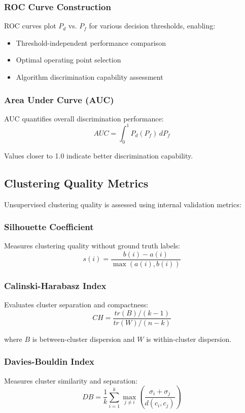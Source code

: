 \subsubsection{ROC Curve Construction}
ROC curves plot $P_d$ vs. $P_f$ for various decision thresholds, enabling:
\begin{itemize}
\item Threshold-independent performance comparison
\item Optimal operating point selection
\item Algorithm discrimination capability assessment
\end{itemize}

\subsubsection{Area Under Curve (AUC)}
AUC quantifies overall discrimination performance:
\begin{equation}
AUC = \int_0^1 P_d(P_f) \, dP_f
\end{equation}

Values closer to 1.0 indicate better discrimination capability.

\subsection{Clustering Quality Metrics}
Unsupervised clustering quality is assessed using internal validation metrics:

\subsubsection{Silhouette Coefficient}
Measures clustering quality without ground truth labels:
\begin{equation}
s(i) = \frac{b(i) - a(i)}{\max(a(i), b(i))}
\end{equation}

\subsubsection{Calinski-Harabasz Index}
Evaluates cluster separation and compactness:
\begin{equation}
CH = \frac{tr(B)/(k-1)}{tr(W)/(n-k)}
\end{equation}

where $B$ is between-cluster dispersion and $W$ is within-cluster dispersion.

\subsubsection{Davies-Bouldin Index}
Measures cluster similarity and separation:
\begin{equation}
DB = \frac{1}{k} \sum_{i=1}^k \max_{j \neq i} \left(\frac{\sigma_i + \sigma_j}{d(c_i, c_j)}\right)
\end{equation}

